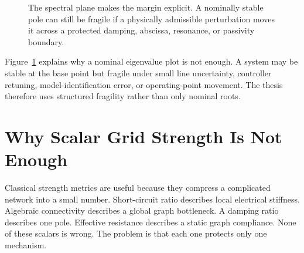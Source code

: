 \begin{figure}[ht]
\centering
{}
\caption{The spectral plane makes the margin explicit. A nominally stable pole
can still be fragile if a physically admissible perturbation moves it across a
protected damping, abscissa, resonance, or passivity boundary.}
\label{fig:framework_spectral_plane}
\end{figure}

Figure~\ref{fig:framework_spectral_plane} explains why a nominal eigenvalue
plot is not enough. A system may be stable at the base point but fragile under
small line uncertainty, controller retuning, model-identification error, or
operating-point movement. The thesis therefore uses structured fragility
rather than only nominal roots.

\section{Why Scalar Grid Strength Is Not Enough}

Classical strength metrics are useful because they compress a complicated
network into a small number. Short-circuit ratio describes local electrical
stiffness. Algebraic connectivity describes a global graph bottleneck. A
damping ratio describes one pole. Effective resistance describes a static
graph compliance. None of these scalars is wrong. The problem is that each one
protects only one mechanism.


